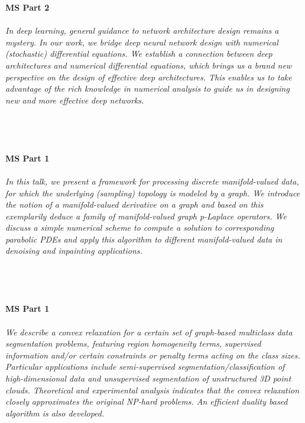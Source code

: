 \begin{multicols}{2}
    \noindent\textbf{MS Part 2}\\
\\  
    \textit{In deep learning, general guidance to network architecture design remains a mystery. In our work, we bridge deep neural network design with numerical (stochastic) differential equations. We establish a connection between deep architectures and numerical differential equations, which brings us a brand new perspective on the design of effective deep architectures. This enables us to take advantage of the rich knowledge in numerical analysis to guide us in designing new and more effective deep networks. }\\
\\ 
    \\
    \\\\
    \noindent\textbf{MS Part 1}\\
\\  
    \textit{In this talk, we present a framework for processing discrete manifold-valued data, for which the underlying (sampling) topology is modeled by a graph. We introduce the notion of a manifold-valued derivative on a graph and based on this exemplarily deduce a family of manifold-valued graph p-Laplace operators. We discuss a simple numerical scheme to compute a solution to corresponding parabolic PDEs and apply this algorithm to different manifold-valued data in denoising and inpainting applications.}\\
\\ 
    \\
    \\\\
    \noindent\textbf{MS Part 1}\\
\\  
    \textit{We describe a convex relaxation for a certain set of graph-based multiclass data segmentation problems, featuring region homogeneity terms, supervised information and/or certain constraints or penalty terms acting on the class sizes. Particular applications include semi-supervised segmentation/classification of high-dimensional data and unsupervised segmentation of unstructured 3D point clouds. Theoretical and experimental analysis indicates that the convex relaxation closely approximates the original NP-hard problems. An efficient duality based algorithm is also developed.}\\
\\ 

\end{multicols}
